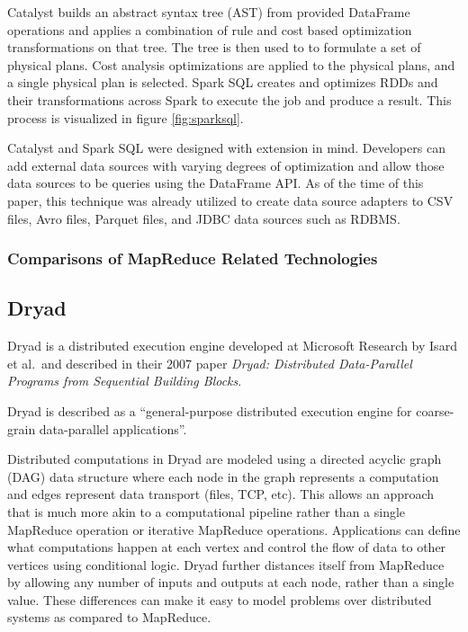 \documentclass[]{article}
\begin{document}
Catalyst builds an abstract syntax tree (AST) from provided DataFrame operations and applies a combination of rule and cost based optimization transformations on that tree. The tree is then used to to formulate a set of physical plans. Cost analysis optimizations are applied to the physical plans, and a single physical plan is selected. Spark SQL creates and optimizes RDDs and their transformations across Spark to execute the job and produce a result. This process is visualized in figure \ref{fig:sparksql}.

Catalyst and Spark SQL were designed with extension in mind. Developers can add external data sources with varying degrees of optimization and allow those data sources to be queries using the DataFrame API. As of the time of this paper, this technique was already utilized to create data source adapters to CSV files, Avro files, Parquet files, and JDBC data sources such as RDBMS.

\subsubsection{Comparisons of MapReduce Related Technologies}

\subsection{Dryad}\label{ssec:dryad}
Dryad is a distributed execution engine developed at Microsoft Research by Isard et al.\ and described in their 2007 paper \textit{Dryad: Distributed Data-Parallel Programs from Sequential Building Blocks}\cite{isard2007dryad}. 

Dryad is described as a ``general-purpose distributed execution engine for coarse-grain data-parallel applications''.

Distributed computations in Dryad are modeled using a directed acyclic graph (DAG) data structure where each node in the graph represents a computation and edges represent data transport (files, TCP, etc). This allows an approach that is much more akin to a computational pipeline rather than a single MapReduce operation or iterative MapReduce operations. Applications can define what computations happen at each vertex and control the flow of data to other vertices using conditional logic. Dryad further distances itself from MapReduce by allowing any number of inputs and outputs at each node, rather than a single value. These differences can make it easy to model problems over distributed systems as compared to MapReduce.
\end{document}
